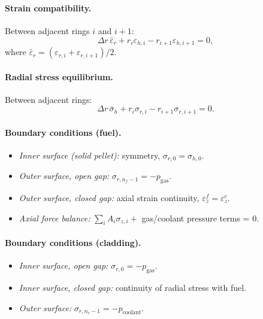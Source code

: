 \documentclass[11pt,a4paper]{article}
\begin{document}
\paragraph{Strain compatibility.}  Between adjacent rings $i$ and $i+1$:
\begin{equation}
  \Delta r \, \bar{\varepsilon}_r + r_i \varepsilon_{h,i} - r_{i+1} \varepsilon_{h,i+1} = 0,
\end{equation}
where $\bar{\varepsilon}_r = (\varepsilon_{r,i} + \varepsilon_{r,i+1})/2$.

\paragraph{Radial stress equilibrium.}  Between adjacent rings:
\begin{equation}
  \Delta r \, \bar{\sigma}_h + r_i \sigma_{r,i} - r_{i+1} \sigma_{r,i+1} = 0.
\end{equation}

\paragraph{Boundary conditions (fuel).}
\begin{itemize}
  \item \emph{Inner surface (solid pellet):} symmetry, $\sigma_{r,0} = \sigma_{h,0}$.
  \item \emph{Outer surface, open gap:} $\sigma_{r,n_f-1} = -p_{\mathrm{gas}}$.
  \item \emph{Outer surface, closed gap:} axial strain continuity, $\varepsilon^f_z = \varepsilon^c_z$.
  \item \emph{Axial force balance:} $\sum_i A_i \sigma_{z,i} + $ gas/coolant pressure terms = 0.
\end{itemize}

\paragraph{Boundary conditions (cladding).}
\begin{itemize}
  \item \emph{Inner surface, open gap:} $\sigma_{r,0} = -p_{\mathrm{gas}}$.
  \item \emph{Inner surface, closed gap:} continuity of radial stress with fuel.
  \item \emph{Outer surface:} $\sigma_{r,n_c-1} = -p_{\mathrm{coolant}}$.
\end{itemize}
\end{document}
